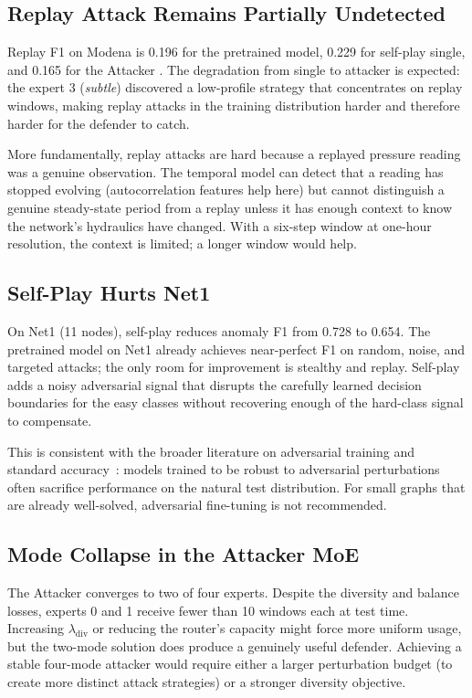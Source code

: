 \subsection{Replay Attack Remains Partially Undetected}
\label{sec:limitations_replay}

Replay F1 on Modena is 0.196 for the pretrained model, 0.229 for
self-play single, and 0.165 for the Attacker \moe{}. The degradation
from single to \moe{} attacker is expected: the \moe{} expert 3
(\emph{subtle}) discovered a low-profile strategy that concentrates
on replay windows, making replay attacks in the training distribution
harder and therefore harder for the defender to catch.

More fundamentally, replay attacks are hard because a replayed
pressure reading was a genuine observation. The temporal model can
detect that a reading has stopped evolving (autocorrelation features
help here) but cannot distinguish a genuine steady-state period from
a replay unless it has enough context to know the network's hydraulics
have changed. With a six-step window at one-hour resolution, the
context is limited; a longer window would help.

\subsection{Self-Play Hurts Net1}
\label{sec:limitations_net1}

On Net1 (11 nodes), self-play reduces anomaly F1 from 0.728 to 0.654.
The pretrained model on Net1 already achieves near-perfect F1 on
random, noise, and targeted attacks; the only room for improvement
is stealthy and replay. Self-play adds a noisy adversarial signal that
disrupts the carefully learned decision boundaries for the easy
classes without recovering enough of the hard-class signal to
compensate.

This is consistent with the broader literature on adversarial
training and standard accuracy~\cite{ilyas2019adversarial}: models
trained to be robust to adversarial perturbations often sacrifice
performance on the natural test distribution. For small graphs that
are already well-solved, adversarial fine-tuning is not recommended.

\subsection{Mode Collapse in the Attacker MoE}

The Attacker \moe{} converges to two of four experts. Despite the
diversity and balance losses, experts 0 and 1 receive fewer than
10 windows each at test time. Increasing $\lambda_\text{div}$
or reducing the router's capacity might force more uniform usage,
but the two-mode solution does produce a genuinely useful defender.
Achieving a stable four-mode attacker would require either a larger
perturbation budget (to create more distinct attack strategies) or
a stronger diversity objective.

